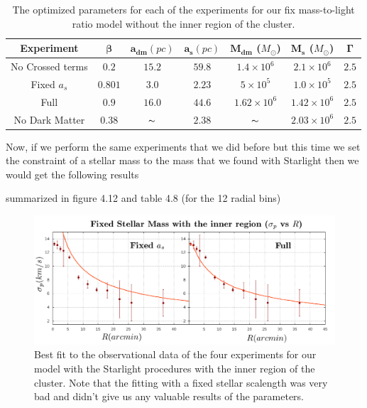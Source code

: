 \begin{table}[H]
\begin{center}
\begin{tabular}{| c| c| c| c| c| c| c|}
    \hline
    \textbf{Experiment} & $\mathbf{\beta}$ & $\mathbf{a_{dm}} (pc)$ & $\mathbf{a_{s}} (pc)$ & $\mathbf{M_{dm}}$ ($M_{\odot}$) & $\mathbf{M_{s}}$ ($M_{\odot}$) & $\mathbf{\Gamma}$\\ \hline
	No Crossed terms & $0.2$ &	$15.2$ &	$59.8$ &	$1.4 \times 10^{6}$ &	$2.1 \times 10^{6}$ &	$2.5$\\ \hline
	Fixed $a_s$ &	$0.801$ &	$3.0$ &	$2.23$ &	$5 \times 10^{5}$ &	$1.0 \times 10 ^{5}$ &	$2.5$\\ \hline
	Full &	$0.9$ &	$16.0$ &	$44.6$ &	$1.62 \times 10^{6}$ &	$1.42 \times 10^{6}$ &	$2.5$\\ \hline
	No Dark Matter &	$0.38$ &	$\thicksim$ & $ 2.38$ &	$\thicksim$ & $  2.03 \times 10^{6}$ & 	$2.5$\\
    \hline
  \end{tabular} 
\caption[Optimized parameters for our fix mass-to-light ratio model without the inner region.]{The optimized parameters for each of the experiments for our fix mass-to-light ratio model without the inner region of the cluster.}
\end{center}
\end{table} 

Now, if we perform the same experiments that we did before but this time we set the constraint of a stellar mass to the mass that we found with Starlight then we would get the following results

 summarized in figure 4.12 and table 4.8 (for the 12 radial bins)

\begin{figure}[H]
\centering
\includegraphics[width=15cm]{images/Starlight_2.png}
\caption[Best fit of our model with the mass found with the Starlight procedures with the inner region]{Best fit to the observational data of the four experiments for our model with the Starlight procedures with the inner region of the cluster. Note that the fitting with a fixed stellar scalength was very bad and didn't give us any valuable results of the parameters.}
\end{figure}

